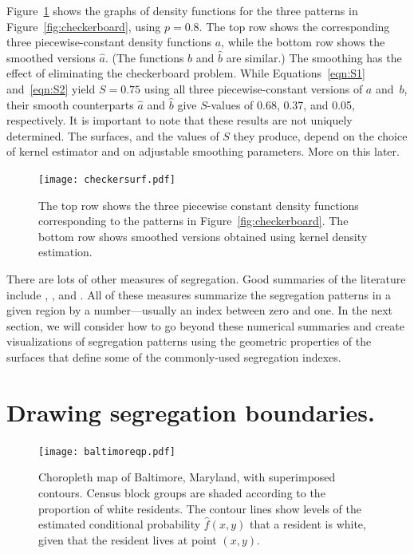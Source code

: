 \documentclass{article}
\theoremstyle{theorem}
\theoremstyle{definition}
\begin{document}
Figure~\ref{fig:kdeexamples} shows the graphs of density functions for the three patterns in Figure~\ref{fig:checkerboard}, using $p = 0.8$. The top row shows the corresponding three piecewise-constant density functions $a$, while the bottom row shows the smoothed versions $\hat{a}$. (The functions $b$ and $\hat{b}$ are similar.) The smoothing has the effect of eliminating the checkerboard problem. While Equations~\ref{eqn:S1} and~\ref{eqn:S2} yield $S = 0.75$ using all three piecewise-constant versions of $a$ and~$b$, their smooth counterparts $\hat{a}$ and $\hat{b}$ give $S$-values of 0.68, 0.37, and 0.05, respectively.
It is important to note that these results are not uniquely determined. The surfaces, and the values of $S$ they produce, depend on the choice of kernel estimator and on adjustable smoothing parameters. More on this later.

\begin{figure}
  \texttt{[image: checkersurf.pdf]} %
  \caption{The top row shows the three piecewise constant density functions corresponding to the patterns in Figure~\ref{fig:checkerboard}. The bottom row shows smoothed versions obtained using kernel density estimation.}
  \label{fig:kdeexamples}
\end{figure}

There are lots of other measures of segregation. Good summaries of the literature include \cite{reardonosullivan04}, \cite{harrisjohnson18}, and \cite{yao18}. All of these measures summarize the segregation patterns in a given region by a number---usually an index between zero and one. In the next section, we will consider how to go beyond these numerical summaries and create visualizations of segregation patterns using the geometric properties of the surfaces that define some of the commonly-used segregation indexes.

\section{Drawing segregation boundaries.}

\begin{figure}\centering
  \texttt{[image: baltimoreqp.pdf]}
  \caption{Choropleth map of Baltimore, Maryland, with superimposed contours. Census block groups are shaded according to the proportion of white residents. The contour lines show levels of the estimated conditional probability $\hat{f}(x,y)$ that a resident is white, given that the resident lives at point $(x,y)$.}
  \label{fig:choropleth}
\end{figure}
\end{document}
